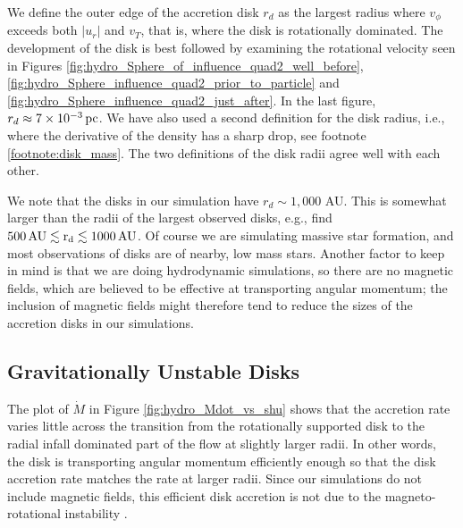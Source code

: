 \documentclass[../dissertation.tex]{subfiles}
\begin{document}
We define the outer edge of the accretion disk $r_d$ as the largest radius 
where $v_\phi$ exceeds both $|u_r|$ and $v_T$, that is, where the 
disk is rotationally dominated. The development of the disk is best followed 
by examining the rotational velocity seen in 
Figures \ref{fig:hydro_Sphere_of_influence_quad2_well_before},
\ref{fig:hydro_Sphere_influence_quad2_prior_to_particle} and
\ref{fig:hydro_Sphere_influence_quad2_just_after}. In the last 
figure, $r_d\approx7\times10^{-3}\,\rm pc$. 
We have also used a second definition for the disk radius, i.e., 
where the derivative of the density has a sharp drop, see footnote \ref{footnote:disk_mass}. The two definitions of the disk radii agree 
well with each other.

We note that the disks in our simulation have $r_d\sim 1,000$ AU. 
This is somewhat larger than the radii of the largest observed disks, e.g., \citet{1999AJ....117.1490P} find
$500\,\rm AU\lesssim r_d\lesssim 1000\,\rm AU$. Of course we are simulating massive
star formation, and most observations of disks are of nearby, low mass stars. Another
factor to keep in mind is that we are doing hydrodynamic simulations, so there are
no magnetic fields, which are believed to be effective at transporting angular momentum; 
the inclusion of magnetic fields might therefore tend to reduce the sizes of the accretion
disks in our simulations. 

\subsection{Gravitationally Unstable Disks}

The plot of $\dot{M}$ in Figure \ref{fig:hydro_Mdot_vs_shu} shows that the accretion rate varies little across the transition from the rotationally supported disk to the 
radial infall dominated part of the flow at slightly larger radii. In other 
words, the disk is transporting angular momentum efficiently enough so that 
the disk accretion rate matches the rate at larger radii. Since our simulations 
do not include magnetic fields, this efficient disk accretion is not due to the magneto-rotational instability \citep{1991ApJ...376..214B,1998RvMP...70....1B}.
\end{document}
